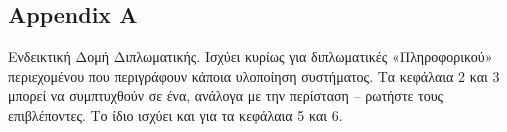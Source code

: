 \documentclass[12pt]{article}
\begin{document}
\newpage


\newpage


\newpage

\tableofcontents
\newpage


\newpage


\newpage


\newpage


\newpage


\newpage


\newpage

\printbibliography
\newpage

\begin{appendices}
    \section*{Appendix A}
    Ενδεικτική Δομή Διπλωματικής. Ισχύει κυρίως για διπλωματικές «Πληροφορικού» περιεχομένου που περιγράφουν κάποια υλοποίηση συστήματος. Τα κεφάλαια 2 και 3 μπορεί να συμπτυχθούν σε ένα, ανάλογα με την περίσταση – ρωτήστε τους επιβλέποντες. Το ίδιο ισχύει και για τα κεφάλαια 5 και 6. \\~\\


\end{appendices}
\end{document}
